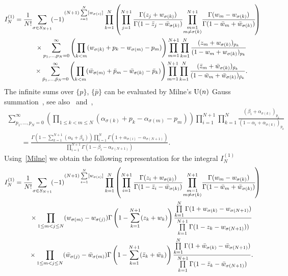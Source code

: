 \documentclass[pdftex]{sigma}
\numberwithin{equation}{section}
\begin{document}
\begin{gather*}
I_N^{(1)}
=\frac1{N!}\!\sum_{\sigma\in S_{N+1}}\! (-1)^{(N+1)\sum\limits_{s=1}^N
[w_{\sigma(s)}]}\prod_{k=1}^{N}\left(
\prod_{j=1}^{N+1}\frac{\Gamma(z_j+w_{\sigma(k)})}{\Gamma(1-\bar z_j-\bar w_{\sigma(k)})}
\!\prod_{\substack{m=1\\ m\neq \sigma(k)}}^{N+1}\!
 \frac{ \Gamma(w_m-w_{\sigma(k)})}{\Gamma(1-\bar w_m+\bar w_{\sigma(k)})}\!\right)
\\
\hphantom{I_N^{(1)} =}{}
\times
\sum_{p_1,\ldots,p_N= 0}^\infty
 \left(\prod_{k<m} (w_{\sigma(k)}+p_k-w_{\sigma(m)}-p_m)\right)\prod_{m=1}^{N+1} \prod_{k=1}^{N}
\frac{(z_m+w_{\sigma(k)})_{p_k}}{(1-w_m+w_{\sigma(k)})_{p_k}}
\notag\\
\hphantom{I_N^{(1)} =}{}
\times
\sum_{\bar p_1,\ldots,\bar p_N=0}^\infty
 \left(\prod_{k<m} (\bar w_{\sigma(m)}+\bar p_m-\bar w_{\sigma(k)}-\bar p_k)\right)
\prod_{m=1}^{N+1} \prod_{k=1}^{N}
\frac{(\bar z_m+\bar w_{\sigma(k)})_{\bar p_k}}{(1-\bar w_m+\bar w_{\sigma(k)})_{\bar p_k}} .
\end{gather*}
The infinite sums over $\{ p\}$, $\{\bar p\}$ can be evaluated by Milne's ${\rm U}(n)$ Gauss
summation~\cite{MILNE198859}, see also~\cite[equation~(5.8)]{Gustafson94} and~\cite{Schlosser},
\begin{gather}
\sum_{p_1,\ldots,p_N = 0}^\infty \left(\prod_{1\leq k<m\leq N} (\alpha_{\sigma(k)}+p_k-\alpha_{\sigma(m)}-p_m)\right)
\prod_{i=1}^{N+1} \prod_{k=1}^{N}\frac{(\beta_i+\alpha_{\sigma(k)})_{p_k}}{(1-\alpha_i+\alpha_{\sigma(k)})_{p_k}}\nonumber\\
 \qquad{}=\frac{\Gamma\left(1-\sum\limits_{k=1}^{N+1}(\alpha_k+\beta_k)\right)
\prod\limits_{i=1}^{N}\Gamma(1+\alpha_{\sigma(i)}-\alpha_{\sigma(N+1)})}
{\prod\limits_{i=1}^{N+1}\Gamma(1-\beta_i-\alpha_{\sigma(N+1)})}.\label{Milne}
\end{gather}
Using~\eqref{Milne} we obtain the following representation for the integral $I_N^{(1)}$
\begin{gather*}
I_N^{(1)} =\frac1{N!}\!\sum_{\sigma\in S_{N+1}} \!(-1)^{(N+1)\sum\limits_{s=1}^N
[w_{\sigma(s)}] }\prod_{k=1}^{N}\left(
\prod_{i=1}^{N+1}\frac{\Gamma(z_i+w_{\sigma(k)})}{\Gamma(1-\bar z_i-\bar w_{\sigma(k)})}
\!\prod_{\substack{m=1\\ m\neq \sigma(k)}}^{N+1}\!
 \frac{ \Gamma(w_m-w_{\sigma(k)})}{\Gamma(1-\bar w_m+\bar w_{\sigma(k)})}\!\right)\\
\hphantom{I_N^{(1)} =}{} \times
\prod_{1\leq m<j\leq N} (w_{\sigma(m)}-w_{\sigma(j)})
\Gamma\left(1-\sum_{k=1}^{N+1}(z_k+w_k)\right)
\frac{\prod\limits_{k=1}^{N}\Gamma(1+w_{\sigma(k)}-w_{\sigma(N+1)})}
{\prod\limits_{k=1}^{N+1} \Gamma(1-z_k-w_{\sigma(N+1)}))}\\
\hphantom{I_N^{(1)} =}{} \times \prod_{1\leq m<j\leq N}
(\bar w_{\sigma(j)}-\bar w_{\sigma(m)})
\Gamma\left(1-\sum_{k=1}^{N+1}(\bar z_k+\bar w_k)\right)
\frac{\prod\limits_{k=1}^{N}
\Gamma(1+\bar w_{\sigma(k)}-\bar w_{\sigma(N+1)})}{
\prod\limits_{k=1}^{N+1}
\Gamma(1-\bar z_k-\bar w_{\sigma(N+1)})}.
\end{gather*}
\end{document}
